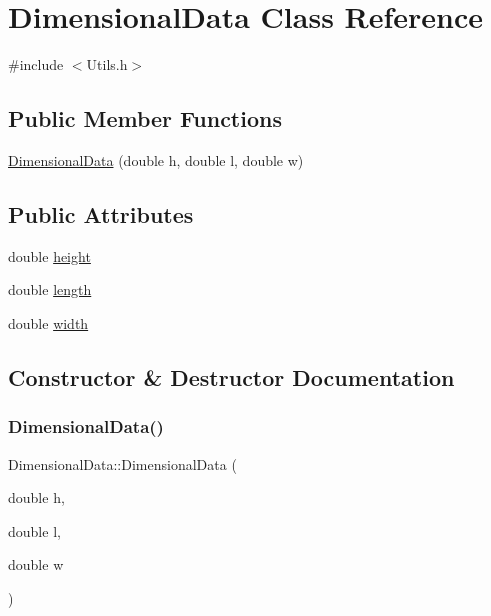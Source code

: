 \hypertarget{class_dimensional_data}{}\section{Dimensional\+Data Class Reference}
\label{class_dimensional_data}


{\ttfamily \#include $<$Utils.\+h$>$}

\subsection*{Public Member Functions}
\begin{DoxyCompactItemize}
\item 
\hyperlink{class_dimensional_data_a85c1d983a7dbe67ed9d93336e37b2b74}{Dimensional\+Data} (double h, double l, double w)
\end{DoxyCompactItemize}
\subsection*{Public Attributes}
\begin{DoxyCompactItemize}
\item 
double \hyperlink{class_dimensional_data_ad5deedd58ab9d79954d33780f0e2fce2}{height}
\item 
double \hyperlink{class_dimensional_data_a07f712bbdabdc7cadc671feb480065a4}{length}
\item 
double \hyperlink{class_dimensional_data_a5ed5474d8c61c0871189f083c76a39f9}{width}
\end{DoxyCompactItemize}


\subsection{Constructor \& Destructor Documentation}
\mbox{\label{class_dimensional_data_a85c1d983a7dbe67ed9d93336e37b2b74}} 
\subsubsection{\texorpdfstring{Dimensional\+Data()}{DimensionalData()}}
{\footnotesize\ttfamily Dimensional\+Data\+::\+Dimensional\+Data (\begin{DoxyParamCaption}\item[{double}]{h,  }\item[{double}]{l,  }\item[{double}]{w }\end{DoxyParamCaption})\hspace{0.3cm}{\ttfamily [inline]}}

